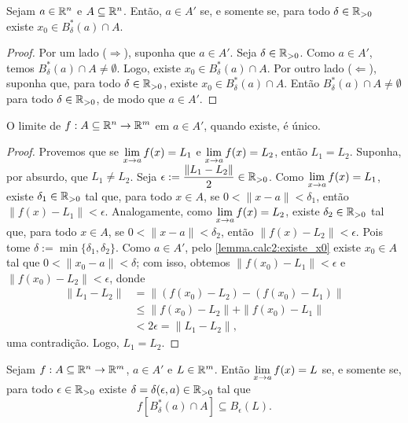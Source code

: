 \begin{lemma} \label{lemma.calc2:existe_x0}
    Sejam $a \in \mathbb{R}^n$ e $A \subseteq \mathbb{R}^n$. Então, $a \in A'$ se, e somente se, para todo $\delta \in \mathbb{R}_{>0}$ existe $x_0 \in B^*_{\delta}(a) \cap A$.
\end{lemma}

\begin{proof}
    Por um lado ($\Rightarrow$), suponha que $a \in A'$. Seja $\delta \in \mathbb{R}_{>0}$. Como $a \in A'$, temos $B^*_{\delta}(a) \cap A \neq \emptyset$. Logo, existe $x_0 \in B^*_{\delta}(a) \cap A$. Por outro lado ($\Leftarrow$), suponha que, para todo $\delta \in \mathbb{R}_{>0}$, existe $x_0 \in B^*_{\delta}(a) \cap A$. Então $B^*_{\delta}(a) \cap A \neq \emptyset$ para todo $\delta \in \mathbb{R}_{>0}$, de modo que $a \in A'$. \blackproof
\end{proof}

\begin{proposition}[Unicidade] \label{teo.calc2:unicidade_limite_bilateral}
    O limite de $f : A \subseteq \mathbb{R}^n \to \mathbb{R}^m$ em $a \in A'$, quando existe, é único.
\end{proposition}

\begin{proof}
    Provemos que se $\displaystyle \lim_{x \to a} f(x) = L_1$ e $\displaystyle \lim_{x \to a} f(x) = L_2$, então $L_1 = L_2$. Suponha, por absurdo, que $L_1 \neq L_2$. Seja $\epsilon := \dfrac{\|L_1 - L_2\|}{2} \in \mathbb{R}_{>0}$. Como $\displaystyle \lim_{x \to a} f(x) = L_1$, existe $\delta_1 \in \mathbb{R}_{>0}$ tal que, para todo $x \in A$, se $0 < \|x-a\| < \delta_1$, então $\|f(x) - L_1\| < \epsilon$. Analogamente, como $\displaystyle \lim_{x \to a} f(x) = L_2$, existe $\delta_2 \in \mathbb{R}_{>0}$ tal que, para todo $x \in A$, se $0 < \|x-a\| < \delta_2$, então $\|f(x) - L_2\| < \epsilon$. Pois tome $\delta := \min\{\delta_1, \delta_2 \}$. Como $a \in A'$, pelo \cref{lemma.calc2:existe_x0} existe $x_0 \in A$ tal que $0<\|x_0-a\|<\delta$; com isso, obtemos $\|f(x_0) - L_1\| < \epsilon$ e $\|f(x_0) - L_2\| < \epsilon$, donde
        \begin{align*}
            \|L_1 - L_2\| &= \|(f(x_0) - L_2) - (f(x_0)-L_1)\| \\
            &\leq \|f(x_0) - L_2\| + \|f(x_0)-L_1\| \\
            &< 2 \epsilon = \|L_1 - L_2\|,
        \end{align*}
    uma contradição. Logo, $L_1 = L_2$. \blackproof
\end{proof}

\begin{proposition}
    Sejam $f : A \subseteq \mathbb{R}^n \to \mathbb{R}^m$, $a \in A'$ e $L \in \mathbb{R}^m$. Então $\displaystyle \lim_{x \to a} f(x) = L$ se, e somente se, para todo $\epsilon \in \mathbb{R}_{>0}$ existe $\delta = \delta(\epsilon, a) \in \mathbb{R}_{>0}$ tal que
        \[
            f[B^*_{\delta}(a) \cap A] \subseteq B_{\epsilon}(L).
        \]
\end{proposition}

